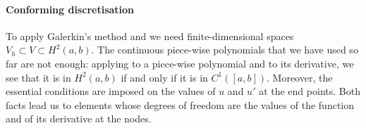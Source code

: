 \paragraph{Conforming discretisation}
To apply Galerkin's method and  we need finite-dimensional spaces $V_h \subset V \subset H^2(a,b)$.
The continuous piece-wise polynomials that we have used so far are not enough: applying  to a piece-wise polynomial and to its derivative, we see that it is in $H^2(a,b)$ if and only if it is in $C^1([a,b])$.
Moreover, the essential conditions are imposed on the values of $u$ and $u'$ at the end points.
Both facts lead us to elements whose degrees of freedom are the values of the function and of its derivative at the nodes.
